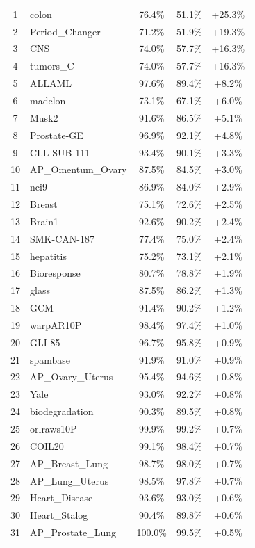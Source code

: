 \documentclass[preprint,12pt,authoryear]{elsarticle}
\begin{document}
{\begin{longtable}{|c|p{4.5cm}|c|c|c|}
1 & colon & 76.4\% & 51.1\% & +25.3\% \\
2 & Period\_Changer & 71.2\% & 51.9\% & +19.3\% \\
3 & CNS & 74.0\% & 57.7\% & +16.3\% \\
4 & tumors\_C & 74.0\% & 57.7\% & +16.3\% \\
5 & ALLAML & 97.6\% & 89.4\% & +8.2\% \\
6 & madelon & 73.1\% & 67.1\% & +6.0\% \\
7 & Musk2 & 91.6\% & 86.5\% & +5.1\% \\
8 & Prostate-GE & 96.9\% & 92.1\% & +4.8\% \\
9 & CLL-SUB-111 & 93.4\% & 90.1\% & +3.3\% \\
10 & AP\_Omentum\_Ovary & 87.5\% & 84.5\% & +3.0\% \\
11 & nci9 & 86.9\% & 84.0\% & +2.9\% \\
12 & Breast & 75.1\% & 72.6\% & +2.5\% \\
13 & Brain1 & 92.6\% & 90.2\% & +2.4\% \\
14 & SMK-CAN-187 & 77.4\% & 75.0\% & +2.4\% \\
15 & hepatitis & 75.2\% & 73.1\% & +2.1\% \\
16 & Bioresponse & 80.7\% & 78.8\% & +1.9\% \\
17 & glass & 87.5\% & 86.2\% & +1.3\% \\
18 & GCM & 91.4\% & 90.2\% & +1.2\% \\
19 & warpAR10P & 98.4\% & 97.4\% & +1.0\% \\
20 & GLI-85 & 96.7\% & 95.8\% & +0.9\% \\
21 & spambase & 91.9\% & 91.0\% & +0.9\% \\
22 & AP\_Ovary\_Uterus & 95.4\% & 94.6\% & +0.8\% \\
23 & Yale & 93.0\% & 92.2\% & +0.8\% \\
24 & biodegradation & 90.3\% & 89.5\% & +0.8\% \\
25 & orlraws10P & 99.9\% & 99.2\% & +0.7\% \\
26 & COIL20 & 99.1\% & 98.4\% & +0.7\% \\
27 & AP\_Breast\_Lung & 98.7\% & 98.0\% & +0.7\% \\
28 & AP\_Lung\_Uterus & 98.5\% & 97.8\% & +0.7\% \\
29 & Heart\_Disease & 93.6\% & 93.0\% & +0.6\% \\
30 & Heart\_Stalog & 90.4\% & 89.8\% & +0.6\% \\
31 & AP\_Prostate\_Lung & 100.0\% & 99.5\% & +0.5\% \\

\end{longtable}}
\end{document}
